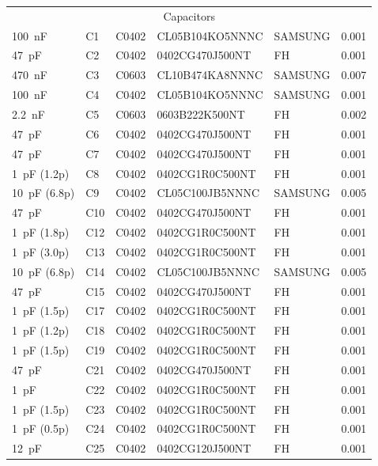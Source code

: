 \begin{appendices}
\begin{footnotesize}
\begin{longtable}{llllll}
    \multicolumn{6}{c}{\cellcolor[HTML]{EFEFEF}Capacitors} \\
    \SI{100}{\nano\farad} & C1 & C0402 & CL05B104KO5NNNC & SAMSUNG & 0.001 \\
    \SI{47}{\pico\farad} & C2 & C0402 & 0402CG470J500NT & FH & 0.001 \\
    \SI{470}{\nano\farad} & C3 & C0603 & CL10B474KA8NNNC & SAMSUNG & 0.007 \\
    \SI{100}{\nano\farad} & C4 & C0402 & CL05B104KO5NNNC & SAMSUNG & 0.001 \\
    \SI{2.2}{\nano\farad} & C5 & C0603 & 0603B222K500NT & FH & 0.002 \\
    \SI{47}{\pico\farad} & C6 & C0402 & 0402CG470J500NT & FH & 0.001 \\
    \SI{47}{\pico\farad} & C7 & C0402 & 0402CG470J500NT & FH & 0.001 \\
    \SI{1}{\pico\farad} (1.2p) & C8 & C0402 & 0402CG1R0C500NT & FH & 0.001 \\
    \SI{10}{\pico\farad} (6.8p) & C9 & C0402 & CL05C100JB5NNNC & SAMSUNG & 0.005 \\
    \SI{47}{\pico\farad} & C10 & C0402 & 0402CG470J500NT & FH & 0.001 \\
    \SI{1}{\pico\farad} (1.8p) & C12 & C0402 & 0402CG1R0C500NT & FH & 0.001 \\
    \SI{1}{\pico\farad} (3.0p) & C13 & C0402 & 0402CG1R0C500NT & FH & 0.001 \\
    \SI{10}{\pico\farad} (6.8p) & C14 & C0402 & CL05C100JB5NNNC & SAMSUNG & 0.005 \\
    \SI{47}{\pico\farad} & C15 & C0402 & 0402CG470J500NT & FH & 0.001 \\
    \SI{1}{\pico\farad} (1.5p) & C17 & C0402 & 0402CG1R0C500NT & FH & 0.001 \\
    \SI{1}{\pico\farad} (1.2p) & C18 & C0402 & 0402CG1R0C500NT & FH & 0.001 \\
    \SI{1}{\pico\farad} (1.5p) & C19 & C0402 & 0402CG1R0C500NT & FH & 0.001 \\
    \SI{47}{\pico\farad} & C21 & C0402 & 0402CG470J500NT & FH & 0.001 \\
    \SI{1}{\pico\farad} & C22 & C0402 & 0402CG1R0C500NT & FH & 0.001 \\
    \SI{1}{\pico\farad} (1.5p) & C23 & C0402 & 0402CG1R0C500NT & FH & 0.001 \\
    \SI{1}{\pico\farad} (0.5p) & C24 & C0402 & 0402CG1R0C500NT & FH & 0.001 \\
    \SI{12}{\pico\farad} & C25 & C0402 & 0402CG120J500NT & FH & 0.001 \\

\end{longtable}
\end{footnotesize}
\end{appendices}
